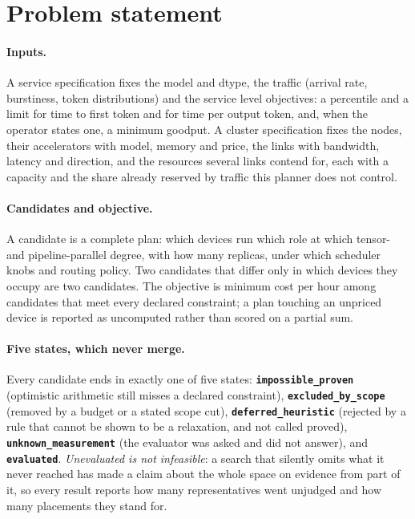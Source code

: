 \section{Problem statement}
\label{sec:problem}

\paragraph{Inputs.}
A service specification fixes the model and dtype, the traffic (arrival rate,
burstiness, token distributions) and the service level objectives: a
percentile and a limit for time to first token and for time per output token,
and, when the operator states one, a minimum goodput. A cluster specification
fixes the nodes, their accelerators with model, memory and price, the links
with bandwidth, latency and direction, and the resources several links contend
for, each with a capacity and the share already reserved by traffic this
planner does not control.

\paragraph{Candidates and objective.}
A candidate is a complete plan: which devices run which role at which tensor-
and pipeline-parallel degree, with how many replicas, under which scheduler
knobs and routing policy. Two candidates that differ only in which devices
they occupy are two candidates. The objective is minimum cost per hour among
candidates that meet every declared constraint; a plan touching an unpriced
device is reported as uncomputed rather than scored on a partial sum.

\paragraph{Five states, which never merge.}
Every candidate ends in exactly one of five states:
\textbf{\texttt{impossible\_proven}} (optimistic arithmetic still misses a
declared constraint), \textbf{\texttt{excluded\_by\_scope}} (removed by a
budget or a stated scope cut), \textbf{\texttt{deferred\_heuristic}} (rejected
by a rule that cannot be shown to be a relaxation, and not called proved),
\textbf{\texttt{unknown\_measurement}} (the evaluator was asked and did not
answer), and \textbf{\texttt{evaluated}}. \emph{Unevaluated is not
infeasible}: a search that silently omits what it never reached has made a
claim about the whole space on evidence from part of it, so every result
reports how many representatives went unjudged and how many placements they
stand for.

